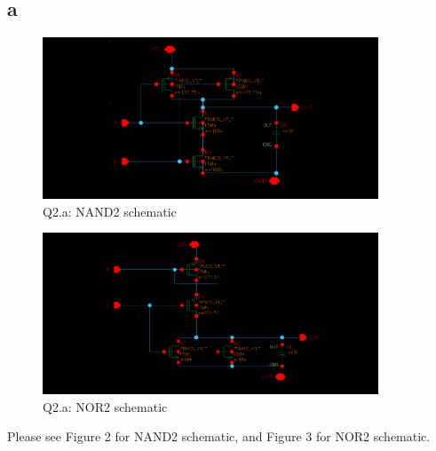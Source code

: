 \documentclass[a4paper,10pt]{article}
\begin{document}
\subsection*{a}
\begin{figure}
 \centering
 \includegraphics[width=10cm]{NAND2.png}
 \caption{Q2.a: NAND2 schematic}
\end{figure}
\begin{figure}
 \centering
 \includegraphics[width=10cm]{NOR2.png}
 \caption{Q2.a: NOR2 schematic}
\end{figure}
Please see Figure 2 for NAND2 schematic, and Figure 3 for NOR2 schematic.
\end{document}
